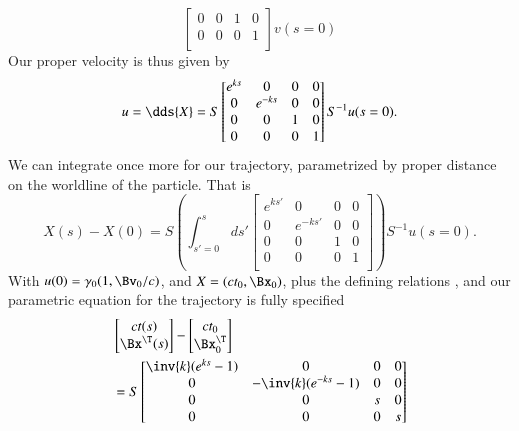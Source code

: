 {\begin{equation}
\begin{bmatrix}
0 & 0 & 1 & 0 \\
0 & 0 & 0 & 1 \\
\end{bmatrix} v(s=0)
\end{equation}
%
Our proper velocity is thus given by
%
\begin{equation}\label{eqn:relElectroDynProblemSet2:870}
u = \dds{X} = S
\begin{bmatrix}
e^{ks} & 0 & 0 & 0 \\
0 & e^{-ks} & 0 & 0 \\
0 & 0 & 1 & 0 \\
0 & 0 & 0 & 1 \\
\end{bmatrix} S^{-1} u(s=0).
\end{equation}
%
We can integrate once more for our trajectory, parametrized by proper distance on the worldline of the particle.  That is
%
\begin{equation}\label{eqn:relElectroDynProblemSet2:890}
X(s) - X(0)
= S \left( \int_{s'=0}^s
ds'
\begin{bmatrix}
e^{ks'} & 0 & 0 & 0 \\
0 & e^{-ks'} & 0 & 0 \\
0 & 0 & 1 & 0 \\
0 & 0 & 0 & 1 \\
\end{bmatrix} \right) S^{-1} u(s=0).
\end{equation}
%
With \(u(0) = \gamma_0 (1, \Bv_0/c)\), and \(X = (c t_0, \Bx_0)\), plus the defining relations , and  our parametric equation for the trajectory is fully specified
%
\begin{equation}\label{eqn:relElectroDynProblemSet2:910}
\begin{aligned}
&\begin{bmatrix}
c t(s) \\
\Bx^\T(s)
\end{bmatrix}
-
\begin{bmatrix}
c t_0 \\
\Bx_0^\T
\end{bmatrix} \\
&= S
\begin{bmatrix}
\inv{k}(e^{ks} -1) & 0 & 0 & 0 \\
0 & -\inv{k}(e^{-ks} -1) & 0 & 0 \\
0 & 0 & s & 0 \\
0 & 0 & 0 & s \\

\end{bmatrix}
\end{aligned}
\end{equation}}
